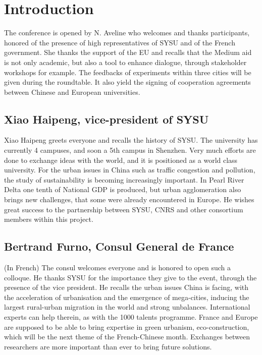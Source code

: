 \documentclass[10pt]{article}
\begin{document}
\section*{Introduction}

The conference is opened by N. Aveline who welcomes and thanks participants, honored of the presence of high representatives of SYSU and of the French government. She thanks the support of the EU and recalls that the Medium aid is not only academic, but also a tool to enhance dialogue, through stakeholder workshops for example. The feedbacks of experiments within three cities will be given during the roundtable. It also yield the signing of cooperation agreements between Chinese and European universities.


\subsection*{Xiao Haipeng, vice-president of SYSU}

Xiao Haipeng greets everyone and recalls the history of SYSU. The university has currently 4 campuses, and soon a 5th campus in Shenzhen. Very much efforts are done to exchange ideas with the world, and it is positioned as a world class university. For the urban issues in China such as traffic congestion and pollution, the study of sustainability is becoming increasingly important. In Pearl River Delta one tenth of National GDP is produced, but urban agglomeration also brings new challenges, that some were already encountered in Europe. He wishes great success to the partnership between SYSU, CNRS and other consortium members within this project.

\subsection*{Bertrand Furno, Consul General de France}


(In French) The consul welcomes everyone and is honored to open such a colloque. He thanks SYSU for the importance they give to the event, through the presence of the vice president. He recalls the urban issues China is facing, with the acceleration of urbanisation and the emergence of mega-cities, inducing the largest rural-urban migration in the world and strong unbalances. International experts can help therein, as with the 1000 talents programme. France and Europe are supposed to be able to bring expertise in green urbanism, eco-construction, which will be the next theme of the French-Chinese month. Exchanges between researchers are more important than ever to bring future solutions.
\end{document}
